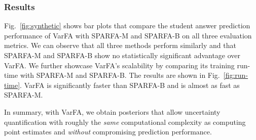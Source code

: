 \subsubsection{Results}
Fig.~\ref{fig:synthetic} shows bar plots that compare the
%
student answer prediction performance of VarFA with SPARFA-M and SPARFA-B on
all three evaluation metrics. We can observe that all three methods perform
similarly and that SPARFA-M and SPARFA-B show no statistically significant
advantage over VarFA. \sloppy We further showcase VarFA's scalability by
comparing its training run-time with SPARFA-M and SPARFA-B. The results are
shown in Fig.~\ref{fig:run-time}. VarFA is significantly faster than SPARFA-B
and is almost as fast as SPARFA-M.

In summary, with VarFA, we obtain posteriors that allow uncertainty
quantification with roughly the \textit{same} computational complexity as
computing point estimates and \textit{without} compromising prediction
performance.
